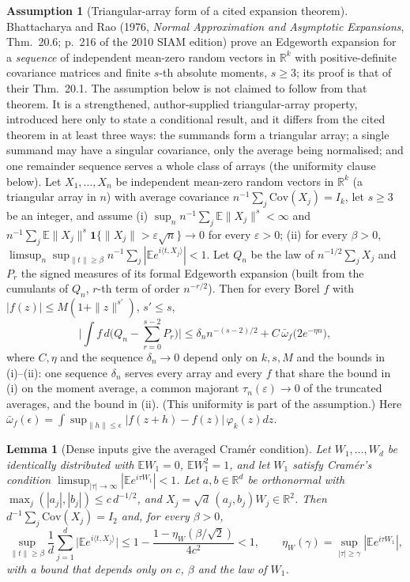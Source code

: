 \documentclass[11pt]{article}
\newtheorem{lemma}{Lemma}
\theoremstyle{definition}
\newtheorem{assumption}{Assumption}
\newcommand{\E}{\mathbb{E}}
\newcommand{\R}{\mathbb{R}}
\begin{document}
\begin{assumption}[Triangular-array form of a cited expansion theorem]\label{ass:br}
Bhattacharya and Rao (1976, \emph{Normal Approximation and Asymptotic Expansions},
Thm.~20.6; p.~216 of the 2010 SIAM edition) prove an Edgeworth expansion for a
\emph{sequence} of independent mean-zero random vectors in $\R^k$ with positive-definite
covariance matrices and finite $s$-th absolute moments, $s\ge3$; its proof is that of
their Thm.~20.1. The assumption below is not claimed to follow from that theorem. It is a
strengthened, author-supplied triangular-array property, introduced here only to state
a conditional result, and it differs from the cited theorem in at least three ways: the
summands form a triangular array; a single summand may have a singular covariance, only
the average being normalised; and one remainder sequence serves a whole class of arrays
(the uniformity clause below). Let $X_{1},\dots,X_{n}$ be independent
mean-zero random vectors in $\R^k$ (a triangular array in $n$) with average covariance
$n^{-1}\sum_j\mathrm{Cov}(X_j)=I_k$, let $s\ge3$ be an integer, and assume
(i) $\sup_n n^{-1}\sum_j\E\|X_j\|^{s}<\infty$ and
$n^{-1}\sum_j\E\|X_j\|^s\mathbf 1\{\|X_j\|>\varepsilon\sqrt n\}\to0$ for every
$\varepsilon>0$; (ii) for every $\beta>0$,
$\limsup_n\sup_{\|t\|\ge\beta}n^{-1}\sum_j|\E e^{i\langle t,X_j\rangle}|<1$.
Let $Q_n$ be the law of $n^{-1/2}\sum_jX_j$ and $P_r$ the signed measures of its formal
Edgeworth expansion (built from the cumulants of $Q_n$, $r$-th term of order $n^{-r/2}$).
Then for every Borel $f$ with $|f(z)|\le M(1+\|z\|^{s'})$, $s'\le s$,
\[
\Big|\int f\,d\Big(Q_n-\sum_{r=0}^{s-2}P_r\Big)\Big|
\le\delta_n n^{-(s-2)/2}+C\,\bar\omega_f\big(2e^{-\eta n}\big),
\]
where $C,\eta$ and the sequence $\delta_n\to0$ depend only on $k,s,M$ and the bounds in
(i)--(ii): one sequence $\delta_n$ serves every array and every $f$ that share the bound
in (i) on the moment average, a common majorant $\tau_n(\varepsilon)\to0$ of the
truncated averages, and the bound in (ii). (This uniformity is part of the assumption.)
Here
$\bar\omega_f(\epsilon)=\int\sup_{\|h\|\le\epsilon}|f(z+h)-f(z)|\,\varphi_k(z)dz$.
\end{assumption}

\begin{lemma}[Dense inputs give the averaged Cramér condition]\label{lem:cramer}
Let $W_1,\dots,W_d$ be identically distributed with $\E W_1=0$, $\E W_1^2=1$, and let
$W_1$ satisfy Cramér's condition $\limsup_{|\tau|\to\infty}|\E e^{i\tau W_1}|<1$.
Let $a,b\in\R^d$ be orthonormal with $\max_j(|a_j|,|b_j|)\le c\,d^{-1/2}$, and
$X_j=\sqrt d\,(a_j,b_j)W_j\in\R^2$. Then $d^{-1}\sum_j\mathrm{Cov}(X_j)=I_2$ and, for
every $\beta>0$,
\[
\sup_{\|t\|\ge\beta}\frac1d\sum_{j=1}^d\big|\E e^{i\langle t,X_j\rangle}\big|
\le1-\frac{1-\eta_W(\beta/\sqrt2)}{4c^2}<1,
\qquad \eta_W(\gamma)=\sup_{|\tau|\ge\gamma}|\E e^{i\tau W_1}|,
\]
with a bound that depends only on $c$, $\beta$ and the law of $W_1$.
\end{lemma}
\end{document}
